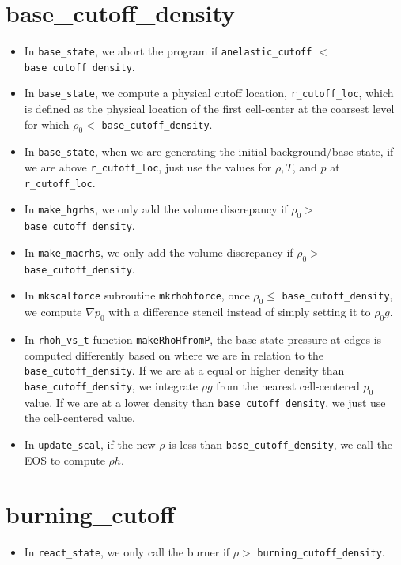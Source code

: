 \documentclass[11pt]{article}
\begin{document}
\section{base\_cutoff\_density}
\begin{itemize}
\item In {\tt base\_state}, we abort the program if {\tt anelastic\_cutoff} $<$ {\tt base\_cutoff\_density}.
\item In {\tt base\_state}, we compute a physical cutoff location, {\tt r\_cutoff\_loc}, which is defined as the physical location of the first cell-center at the coarsest level for which $\rho_0 <$ {\tt base\_cutoff\_density}.
\item In {\tt base\_state}, when we are generating the initial background/base state, if we are above {\tt r\_cutoff\_loc}, just use the values for $\rho,T$, and $p$ at {\tt r\_cutoff\_loc}.
\item In {\tt make\_hgrhs}, we only add the volume discrepancy if $\rho_0 >$ {\tt base\_cutoff\_density}.
\item In {\tt make\_macrhs}, we only add the volume discrepancy if $\rho_0 >$ {\tt base\_cutoff\_density}.
\item In {\tt mkscalforce} subroutine {\tt mkrhohforce}, once $\rho_0 \le$ {\tt base\_cutoff\_density}, we compute $\nabla p_0$ with a difference stencil instead of simply setting it to $\rho_0 g$.
\item In {\tt rhoh\_vs\_t} function {\tt makeRhoHfromP}, the base state pressure at edges is computed differently based on where we are in relation to the {\tt base\_cutoff\_density}.  If we are at a equal or higher density than {\tt base\_cutoff\_density}, we integrate $\rho g$ from the nearest cell-centered $p_0$ value.  If we are at a lower density than {\tt base\_cutoff\_density}, we just use the cell-centered value.
\item In {\tt update\_scal}, if the new $\rho$ is less than {\tt base\_cutoff\_density}, we call the EOS to compute $\rho h$.
\end{itemize}
\section{burning\_cutoff}
\begin{itemize}
\item In {\tt react\_state}, we only call the burner if $\rho >$ {\tt burning\_cutoff\_density}.
\end{itemize}
\end{document}
